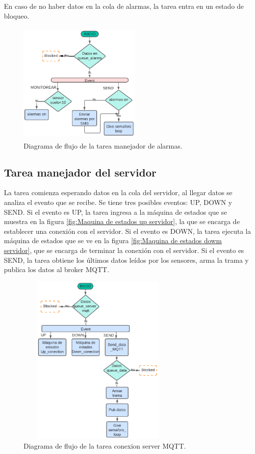 En caso de no haber datos en la cola de alarmas, la tarea entra en un estado de bloqueo.

\begin{figure}[h]
  \centering
	\includegraphics[width=6cm, height=6cm]{./Figures/DF_alarms.png}
	\caption{Diagrama de flujo de la tarea manejador de alarmas.}
	\label{fig:Df tarea alarmas}
\end{figure}

\subsection{Tarea manejador del servidor } 
La tarea comienza esperando datos en la cola del servidor, al llegar datos se analiza el evento que se recibe. Se tiene tres posibles eventos: UP, DOWN y SEND. Si el evento es UP, la tarea ingresa a la máquina de estados que se muestra en la figura \ref{fig:Maquina de estados up servidor}, la que se encarga de establecer una conexión con el servidor. Si el evento es DOWN, la tarea ejecuta la máquina de estados que se ve en la figura \ref{fig:Maquina de estados dowm servidor}, que se encarga de terminar la conexión con el servidor. Si el evento es SEND, la tarea obtiene los últimos datos leídos por los sensores, arma la trama y publica los datos al broker MQTT. 
\begin{figure}[h]
  \centering
	\includegraphics[width=8cm, height=8.5cm]{./Figures/DF general task conection.png}
	\caption{Diagrama de flujo de la tarea conexion server MQTT.}
	\label{fig:Df tarea conexion}
\end{figure}

